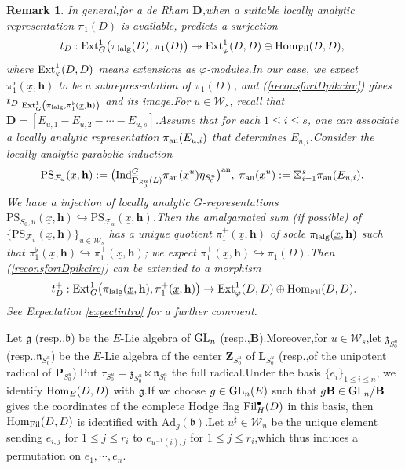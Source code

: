 \documentclass[10pt]{article}
\newtheorem{rmk}[thm]{Remark}
\newcommand{\fil}{{\rm Fil}}
\newcommand{\ind}{{\rm Ind}}
\newcommand{\homo}{{\rm Hom}}
\newcommand{\ext}{{\rm Ext}}
\newcommand{\GLN}{{\rm GL}}
\newcommand{\ana}{{\rm an}}
\newcommand{\op}{{\overline{{\mathbf{P}}}}}
\newcommand{\lalg}{{\rm lalg}}
\newcommand{\Dpik}{{\mathbf{D}}}
\newcommand{\bB}{{\mathbf{B}}}
\newcommand{\bL}{{\mathbf{L}}}
\newcommand{\bP}{{\mathbf{P}}}
\newcommand{\bZ}{{\mathbf{Z}}}
\newcommand{\bh}{{\mathbf{h}}}
\newcommand{\cF}{\mathcal F}
\newcommand{\fb}{{\mathfrak{b}}}
\newcommand{\fg}{{\mathfrak{g}}}
\newcommand{\fn}{{\mathfrak{n}}}
\newcommand{\fz}{{\mathfrak{z}}}
\newcommand{\sW}{\mathscr W}
\begin{document}
\begin{rmk}In general,\;for a de Rham $\Dpik$,\;when a suitable locally analytic representation $\pi_{1}(D)$ is available,\;\cite[(6)]{BDcritical25} predicts a surjection
 \begin{equation}
	\begin{aligned}
t_{D}:\ext^1_{G}\big(\pi_{\lalg}(D),\pi_{1}(D)\big)\twoheadrightarrow\ext^1_{\varphi}(D,D)\oplus\homo_{\fil}(D,D),\;
	\end{aligned}
\end{equation}
where $\ext^1_{\varphi}(D,D)$ means extensions as $\varphi$-modules.\;In our case, we expect $\pi^{\flat}_{1}(\underline{x},\bh)$ to be a subrepresentation of $\pi_{1}(D)$, and (\ref{reconsfortDpikcirc}) gives $t_{D}|_{\ext^1_{G}\left(\pi_{\lalg},\pi^{\flat}_{1}(\underline{x},\bh)\right)}$ and its image.\;For $u\in \sW_s$, recall that $\Dpik=[{E}_{u,1}-{E}_{u,2}-\cdots-{E}_{u,s}]$.\;Assume that for each $1\leq i\leq s$, one can associate a locally analytic representation $\pi_{\ana}({E}_{u,i})$ that determines ${E}_{u,i}$.\;Consider the locally analytic parabolic induction
\begin{equation*}
	\mathrm{PS}_{\cF_{u}
		}(\underline{x},\bh):=\big(\ind^G_{\op_{S^u_0}(L)}\pi_{\ana}(\underline{x}^u)\eta_{S_0^u}\big)^{\ana},\;\pi_{\ana}(\underline{x}^u):=\boxtimes_{i=1}^s\pi_{\ana}({E}_{u,i}).\;
\end{equation*}
We have a injection of locally analytic $G$-representations $\mathrm{PS}_{S_0,u}(\underline{x},\bh)\hookrightarrow\mathrm{PS}_{\cF_{u}}(\underline{x},\bh)$.\;Then the  amalgamated sum (if possible) of $\{\mathrm{PS}_{\cF_{u}}(\underline{x},\bh)\}_{u\in \sW_{s}}$ has a unique quotient $\pi_{1}^+(\underline{x},\bh)$ of socle $\pi_{\lalg}(\underline{x},\bh)$  such that $\pi^{\flat}_{1}(\underline{x},\bh)\hookrightarrow\pi_{1}^+(\underline{x},\bh)$; we expect $\pi_{1}^+(\underline{x},\bh)\hookrightarrow \pi_{1}(D)$.\;Then (\ref{reconsfortDpikcirc}) can be extended to a morphism
\begin{equation}\label{introt+D}
	t^+_{D}:\ext^1_{G}\big(\pi_{\lalg}(\underline{x},\bh),\pi^+_{1}(\underline{x},\bh)\big)\rightarrow\ext^1_{\varphi}(D,D)\oplus\homo_{\fil}(D,D).
\end{equation}
See  Expectation \ref{expectintro} for a further comment.\;
\end{rmk}

Let $\fg$ (resp.,\;$\fb$) be the $E$-Lie algebra of $\GLN_n$ (resp.,\;$\bB$).\;Moreover,\;for $u\in \sW_s$,\;let $\fz_{S^u_0}$ (resp.,\;$\fn_{S^u_0}$) be the $E$-Lie algebra of the center $\bZ_{S^u_0}$ of $\bL_{S_0^u}$ (resp.,\;of the unipotent radical of $\bP_{S^u_0}$).\;Put $\tau_{S^u_0}=\fz_{S^u_0}\ltimes\fn_{S^u_0}$ the full radical.\;Under the basis $\{e_{i}\}_{1\leq i\leq n}$, we identify $\homo_{E}(D,D)$ with $
\fg$.\;If we choose $g\in \GLN_n(E)$ such that $g\bB\in \GLN_n/\bB$ gives the coordinates of the complete Hodge flag $\fil^{\bullet}_{H}(D)$ in this basis, then $\homo_{\fil}(D,D)$ is identified with $\mathrm{Ad}_g(\fb)$.\;Let $u^{\sharp}\in \sW_n$ be the unique element sending $e_{i,j}$ for $1\leq j\leq r_i$ to $e_{u^{-1}(i),j}$ for $1\leq j\leq r_i$,\;which thus induces a permutation on $e_{1},\cdots,e_{n}$.\;
\end{document}
